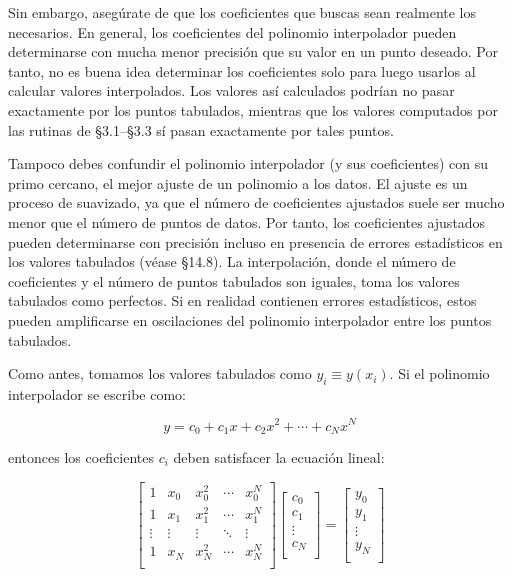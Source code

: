 \documentclass[10pt,a4paper]{book}
\begin{document}
Sin embargo, asegúrate de que los coeficientes que buscas sean realmente los necesarios. En general, los coeficientes del polinomio interpolador pueden determinarse con mucha menor precisión que su valor en un punto deseado. Por tanto, no es buena idea determinar los coeficientes solo para luego usarlos al calcular valores interpolados. Los valores así calculados podrían no pasar exactamente por los puntos tabulados, mientras que los valores computados por las rutinas de \S3.1--\S3.3 sí pasan exactamente por tales puntos.

Tampoco debes confundir el polinomio interpolador (y sus coeficientes) con su primo cercano, el mejor ajuste de un polinomio a los datos. El ajuste es un proceso de suavizado, ya que el número de coeficientes ajustados suele ser mucho menor que el número de puntos de datos. Por tanto, los coeficientes ajustados pueden determinarse con precisión incluso en presencia de errores estadísticos en los valores tabulados (véase \S14.8). La interpolación, donde el número de coeficientes y el número de puntos tabulados son iguales, toma los valores tabulados como perfectos. Si en realidad contienen errores estadísticos, estos pueden amplificarse en oscilaciones del polinomio interpolador entre los puntos tabulados.

Como antes, tomamos los valores tabulados como $y_i \equiv y(x_i)$. Si el polinomio interpolador se escribe como:

\begin{equation}
y = c_0 + c_1 x + c_2 x^2 + \cdots + c_N x^N \tag{3.5.1}
\end{equation}

entonces los coeficientes $c_i$ deben satisfacer la ecuación lineal:

\begin{equation}
\begin{bmatrix}
1 & x_0 & x_0^2 & \cdots & x_0^N \\
1 & x_1 & x_1^2 & \cdots & x_1^N \\
\vdots & \vdots & \vdots & \ddots & \vdots \\
1 & x_N & x_N^2 & \cdots & x_N^N \\
\end{bmatrix}
\begin{bmatrix}
c_0 \\
c_1 \\
\vdots \\
c_N \\
\end{bmatrix}
=
\begin{bmatrix}
y_0 \\
y_1 \\
\vdots \\
y_N \\
\end{bmatrix}
\tag{3.5.2}
\end{equation}
\end{document}
